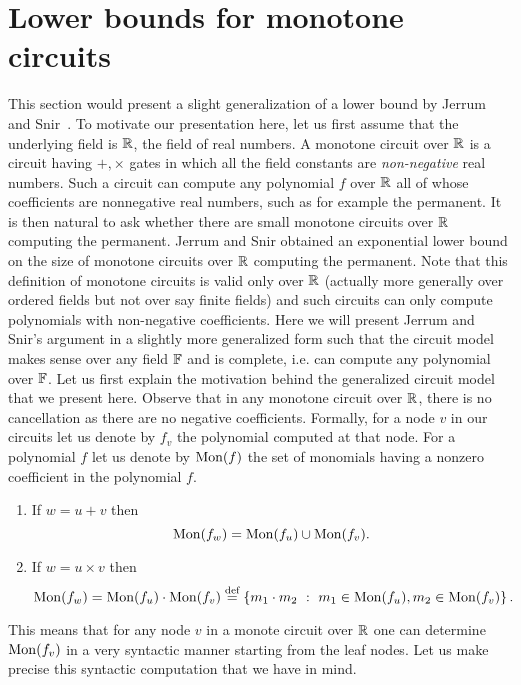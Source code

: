 \section{Lower bounds for monotone circuits}

This section would present a slight generalization 
	of a lower bound by Jerrum and Snir~\cite{js82}. 
	To motivate our presentation here, let us first 
	assume that the underlying field is $\mathbb{R}$, the 
	field of real numbers. A monotone circuit over 
	$\mathbb{R}$ is a circuit having $+, \times$ gates in 
	which all the field constants are {\em non-negative} 
	real numbers. Such a circuit can compute any 
	polynomial $f$ over $\mathbb{R}$ all of whose 
	coefficients are nonnegative real numbers, such as 
	for example the permanent. It is then natural to ask 
	whether there are small monotone circuits over $\mathbb{R}$ 
	computing the permanent. Jerrum and Snir \cite{js82}
	obtained an exponential lower bound on the size 
	of monotone circuits over $\mathbb{R}$ computing the 
	permanent. Note that this	definition of monotone 
	circuits is valid only over $\mathbb{R}$ (actually more 
	generally over ordered fields but not over say finite 
	fields) and such circuits can only compute polynomials 
	with non-negative coefficients. Here we will present 
	Jerrum and Snir's argument in a slightly more 
	generalized form such that the circuit model makes 
	sense over any field $\mathbb{F}$ and is complete, i.e. 
	can compute any polynomial over $\mathbb{F}$. Let us first 
	explain the motivation behind the generalized circuit
	model that we present here. Observe that in any monotone 
	circuit over $\mathbb{R}$, there is no cancellation as there 
	are no negative coefficients. Formally, for a node $v$ 
	in our circuits let us denote by $f_{v}$ the polynomial 
	computed at that node. For a polynomial $f$ let us denote 
	by $\mathrm{Mon}(f)$ the set of monomials having a nonzero 
	coefficient in the polynomial $f$. 
		\begin{enumerate}
		
			\item If $w = u + v$ then 
				$$ \mathrm{Mon}(f_{w}) = \mathrm{Mon}(f_{u}) \cup \mathrm{Mon}(f_{v}). $$
			
			\item If $w = u \times v$ then
				$$ \mathrm{Mon}(f_{w}) = \mathrm{Mon}(f_{u}) \cdot \mathrm{Mon}(f_{v}) \stackrel{\text{def}}{=} \left\{{m_1\cdot m_2}\ : \ {m_1 \in \mathrm{Mon}(f_{u}), m_2\in \mathrm{Mon}(f_{v})}\right\}. $$
			
		\end{enumerate}
	This means that for any node $v$ in a monote circuit over 
	$\mathbb{R}$ one can determine $\mathrm{Mon}(f_{v})$ in a very syntactic 
	manner starting from the leaf nodes. Let us make precise 
	this syntactic computation that we have in mind.
	
